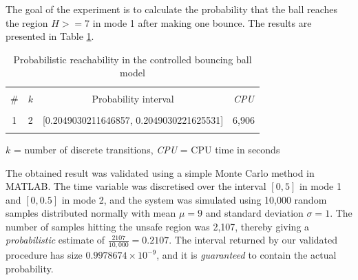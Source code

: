 The goal of the experiment is to calculate the probability that the ball reaches 
the region $H >= 7$ in mode 1 after making one bounce. The results are presented 
in Table \ref{table:controlled-bouncing-ball}.

\begin{table}[ht!] 
\caption{Probabilistic reachability in the controlled bouncing ball model}
\centering
\begin{tabular}{c c c c }
\hline\hline \\ [0.5ex]
\# & $k$ & Probability interval & {\em CPU}\\ [0.5ex] 

\hline \\ [0.5ex]
1 & 2 & [0.2049030211646857, 0.2049030221625531] & 6,906\\ [0.5ex]
\hline \\ [0.5ex]
\end{tabular} 
\label{table:controlled-bouncing-ball} 

$k$ = number of discrete transitions, {\em CPU} = CPU time in seconds
\end{table}

The obtained result was validated using a simple Monte Carlo method in MATLAB. The 
time variable was discretised over the interval $[0, 5]$ in mode 1 and $[0, 0.5]$ in mode 2, 
and the system was simulated using 10,000 random samples distributed normally with mean 
$\mu = 9$ and standard deviation $\sigma = 1$. The number of samples hitting the unsafe 
region was 2,107, thereby giving a {\em probabilistic} estimate of $\frac{2107}{10,000}= 0.2107$. 
The interval returned by our validated procedure has size $0.9978674\times 10^{-9}$, and it
is {\em guaranteed} to contain the actual probability.





